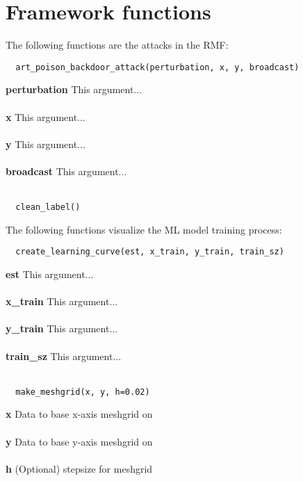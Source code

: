 \section{Framework functions}

The following functions are the attacks in the RMF: \\

\begin{lstlisting}
  art_poison_backdoor_attack(perturbation, x, y, broadcast)
\end{lstlisting}

\noindent\textbf{perturbation}
This argument... \\ \\
\textbf{x}
This argument... \\ \\
\textbf{y}
This argument... \\ \\
\textbf{broadcast}
This argument... \\ \\

\begin{lstlisting}
  clean_label()
\end{lstlisting}

The following functions visualize the ML model training process: \\

\begin{lstlisting}
  create_learning_curve(est, x_train, y_train, train_sz)
\end{lstlisting}

\noindent\textbf{est}
This argument... \\ \\
\textbf{x\_train}
This argument... \\ \\
\textbf{y\_train}
This argument... \\ \\
\textbf{train\_sz}
This argument... \\ \\

\begin{lstlisting}
  make_meshgrid(x, y, h=0.02)
\end{lstlisting}

\noindent\textbf{x}
Data to base x-axis meshgrid on \\ \\
\textbf{y}
Data to base y-axis meshgrid on \\ \\
\textbf{h}
(Optional) stepsize for meshgrid \\ \\

